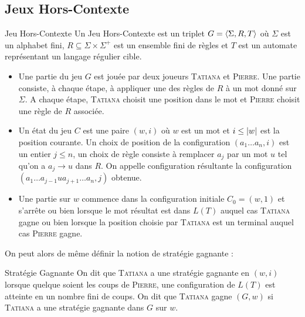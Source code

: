 \documentclass{cours}
\begin{document}
\subsection{Jeux Hors-Contexte}
\begin{définition}{Jeu Hors-Contexte}{}
    Un Jeu Hors-Contexte est un triplet $G = \left\langle \Sigma, R, T \right\rangle$ où $\Sigma$ est un alphabet fini, $R \subseteq \Sigma \times \Sigma^{+}$ est un ensemble fini de règles et $T$ est un automate représentant un langage régulier cible.
    \begin{itemize}
        \item Une partie du jeu $G$ est jouée par deux joueurs \textsc{Tatiana} et \textsc{Pierre}. Une partie consiste, à chaque étape, à appliquer une des règles de $R$ à un mot donné sur $\Sigma$. A chaque étape, \textsc{Tatiana} choisit une position dans le mot et \textsc{Pierre} choisit une règle de $R$ associée.
        \item Un état du jeu $C$ est une paire $(w, i)$ où $w$ est un mot et $i \leq \left|w\right|$ est la position courante. Un choix de position de la configuration $(a_{1}\ldots a_{n}, i)$ est un entier $j \leq n$, un choix de règle consiste à remplacer $a_{j}$ par un mot $u$ tel qu'on a $a_{j} \rightarrow u$ dans $R$. On appelle configuration résultante la configuration $\left(a_{1}\ldots a_{j-1}ua_{j+1}\ldots a_{n}, j\right)$ obtenue. 
        \item Une partie sur $w$ commence dans la configuration initiale $C_{0} = \left(w, 1\right)$ et s'arrête ou bien lorsque le mot résultat est dans $L(T)$ auquel cas \textsc{Tatiana} gagne ou bien lorsque la position choisie par \textsc{Tatiana} est un terminal auquel cas \textsc{Pierre} gagne.
    \end{itemize} 
\end{définition}

On peut alors de même définir la notion de stratégie gagnante : 
\begin{définition}{Stratégie Gagnante}{}
    On dit que \textsc{Tatiana} a une stratégie gagnante en $\left(w, i\right)$ lorsque quelque soient les coups de \textsc{Pierre}, une configuration de $L(T)$ est atteinte en un nombre fini de coups. On dit que \textsc{Tatiana} gagne $\left(G, w\right)$ si \textsc{Tatiana} a une stratégie gagnante dans $G$ sur $w$. 
\end{définition}
\end{document}
